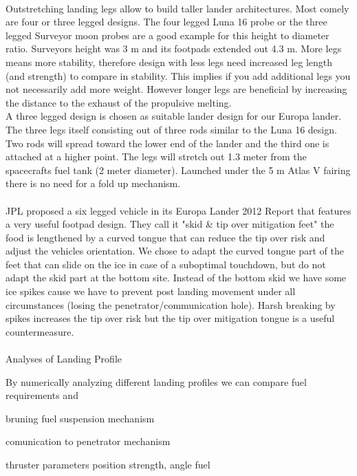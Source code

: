 \\
Outstretching landing legs allow to build taller lander architectures. Most comely are four or three legged designs. The four legged Luna 16 probe or the three legged Surveyor moon probes are a good example for this height to diameter ratio. Surveyors height was 3 m and its footpads extended out 4.3 m. More legs means more stability, therefore design with less legs need increased leg length (and strength) to compare in stability. This implies if you add additional legs you not necessarily add more weight. However longer legs are beneficial by increasing the distance to the exhaust of the propulsive melting. \\
A three legged design is chosen as suitable lander design for our Europa lander. The three legs itself consisting out of three rods similar to the Luna 16 design. Two rods will spread toward the lower end of the lander and the third one is attached at a higher point. The legs will stretch out 1.3 meter from the spacecrafts fuel tank (2 meter diameter).  Launched under the 5 m Atlas V fairing there is no need for a fold up mechanism.\\
 \\
JPL proposed a six legged vehicle in its Europa Lander 2012 Report that features a very useful footpad design. They call it "skid \& tip over mitigation feet" the food is lengthened by a curved tongue that can reduce the tip over risk and adjust the vehicles orientation. We chose to adapt the curved tongue part of the feet that can slide on the ice in case of a suboptimal touchdown, but do not adapt the skid part at the bottom site. Instead of the bottom skid we have some ice spikes cause we have to prevent post landing movement under all circumstances (losing the penetrator/communication hole). Harsh breaking by spikes increases the tip over risk but the tip over mitigation tongue is a useful countermeasure.\\
\\

Analyses of Landing Profile


By numerically analyzing different landing profiles we can compare fuel requirements and 



bruning fuel
suspension mechanism

comunication to penetrator mechanism   



thruster parameters position strength, angle fuel

